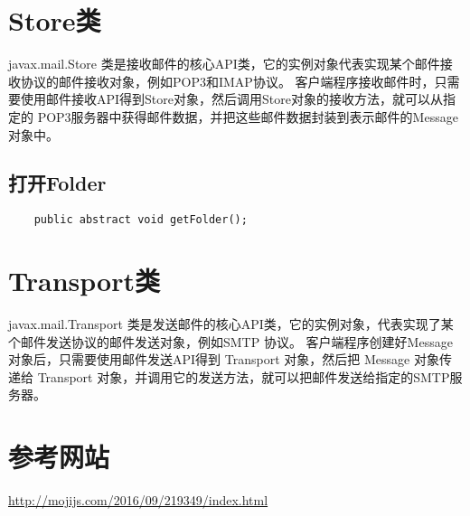 \documentclass[a4paper,left=2.5cm,right=2.5cm,11pt]{article}
\begin{document}
\section{Store类}
	javax.mail.Store 类是接收邮件的核心API类，它的实例对象代表实现某个邮件接收协议的邮件接收对象，例如POP3和IMAP协议。
	客户端程序接收邮件时，只需要使用邮件接收API得到Store对象，然后调用Store对象的接收方法，就可以从指定的 POP3服务器中获得邮件数据，并把这些邮件数据封装到表示邮件的Message对象中。

\subsection{打开Folder}
	\begin{lstlisting}
	public abstract void getFolder();
	\end{lstlisting}

\section{Transport类}
	javax.mail.Transport 类是发送邮件的核心API类，它的实例对象，代表实现了某个邮件发送协议的邮件发送对象，例如SMTP 协议。
	客户端程序创建好Message对象后，只需要使用邮件发送API得到 Transport 对象，然后把 Message 对象传递给 Transport 对象，并调用它的发送方法，就可以把邮件发送给指定的SMTP服务器。

\section{参考网站}
	\url{http://mojijs.com/2016/09/219349/index.html}
\end{document}
